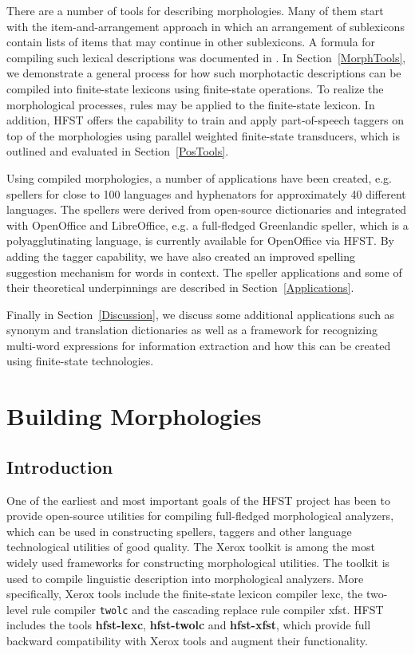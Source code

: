\documentclass{llncs}
\begin{document}
There are a number of tools for describing morphologies. Many of them 
start with the item-and-arrangement approach in which an arrangement of 
sublexicons contain lists of items that may continue in other sublexicons. A formula
for compiling such lexical descriptions was documented in \cite{linden/2009/sfcm}.
In Section~\ref{MorphTools}, we demonstrate a general process for how such morphotactic descriptions 
can be compiled into finite-state lexicons using finite-state operations. 
To realize the morphological processes, rules may be applied to the finite-state lexicon. 
In addition, HFST offers the capability to train and apply part-of-speech
taggers on top of the morphologies using parallel weighted finite-state transducers, 
which is outlined and evaluated in Section~\ref{PosTools}.

Using compiled morphologies, a number of applications
have been created, e.g. spellers for close to 100 languages and
hyphenators for approximately 40 different languages. The spellers were
derived from open-source dictionaries and integrated with OpenOffice and
LibreOffice, e.g. a full-fledged Greenlandic speller, which is a
polyagglutinating language, is currently available for OpenOffice via HFST. 
By adding the tagger capability, we have also created an
improved spelling suggestion mechanism for words in context.
The speller applications and some of their theoretical underpinnings are described 
in Section~\ref{Applications}.

Finally  in Section~\ref{Discussion}, we discuss some additional applications such as synonym and translation dictionaries 
as well as a framework for recognizing multi-word expressions for information extraction and how this can be created 
using finite-state technologies.

\section{Building Morphologies}\label{LexiconTools}

\subsection{Introduction}

One of the earliest and most important goals of the HFST project has
been to provide open-source utilities for compiling full-fledged
morphological analyzers, which can be used in constructing spellers,
taggers and other language technological utilities of good
quality. The Xerox toolkit \cite{beesley/2003} is among the most
widely used frameworks for constructing morphological utilities. The
toolkit is used to compile linguistic description into morphological
analyzers. More specifically, Xerox tools include the finite-state
lexicon compiler lexc, the two-level rule compiler \verb|twolc| and the
cascading replace rule compiler xfst. HFST includes the tools
\textbf{hfst-lexc}, \textbf{hfst-twolc} and \textbf{hfst-xfst}, which provide full backward
compatibility with Xerox tools and augment their functionality.
\end{document}
